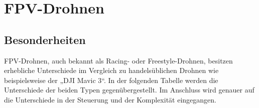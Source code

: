 
\section[FPV-Drohnen]{FPV-Drohnen}
    \subsection[Besonderheiten]{Besonderheiten}
        FPV-Drohnen, auch bekannt als Racing- oder Freestyle-Drohnen, besitzen erhebliche Unterschiede
        im Vergleich zu handelsüblichen Drohnen wie beispielsweise der „DJI Mavic 3“. In der folgenden
        Tabelle werden die Unterschiede der beiden Typen gegenübergestellt. Im Anschluss wird genauer
        auf die Unterschiede in der Steuerung und der Komplexität eingegangen.

